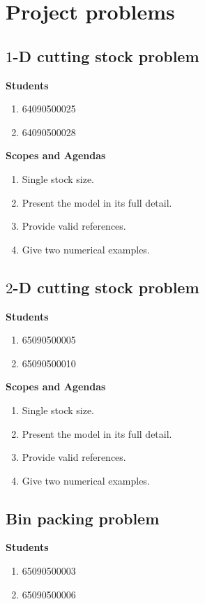 \documentclass[]{report}
\begin{document}
\section*{Project problems}

\subsection*{$1$-D cutting stock problem }
{\bfseries Students}
\begin{enumerate}[label=\arabic*., leftmargin=*]
  \item 64090500025
  \item 64090500028
\end{enumerate}

{\bfseries Scopes and Agendas}
\begin{enumerate}[label=\arabic*., leftmargin=*]
  \item Single stock size.
  \item Present the model in its full detail.
  \item Provide valid references.
  \item Give two numerical examples.
\end{enumerate}


\subsection*{$2$-D cutting stock problem }
{\bfseries Students}
\begin{enumerate}[label=\arabic*., leftmargin=*]
  \item 65090500005
  \item 65090500010
\end{enumerate}

{\bfseries Scopes and Agendas}
\begin{enumerate}[label=\arabic*., leftmargin=*]
  \item Single stock size.
  \item Present the model in its full detail.
  \item Provide valid references.
  \item Give two numerical examples.
\end{enumerate}


\subsection*{Bin packing problem}
{\bfseries Students}
\begin{enumerate}[label=\arabic*., leftmargin=*]
  \item 65090500003
  \item 65090500006
\end{enumerate}
\end{document}
